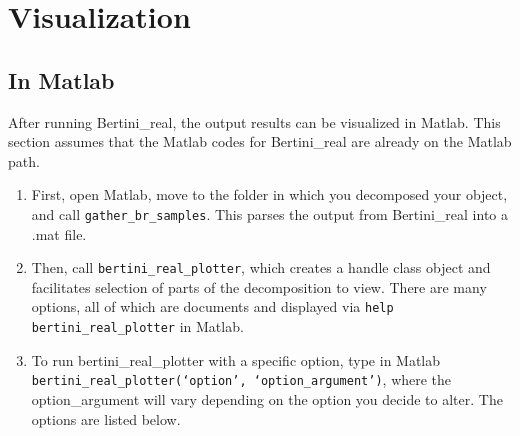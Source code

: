 
\section{Visualization}


\subsection{In Matlab}
After running Bertini\_real, the output results can be visualized in Matlab.  This section assumes that the Matlab codes for Bertini\_real are already on the Matlab path.

\begin{enumerate}
\item First, open Matlab, move to the folder in which you decomposed your object, and call \texttt{gather\_br\_samples}. This parses the output from Bertini\_real into a .mat file.
\item Then, call \texttt{bertini\_real\_plotter\-}, which creates a handle class object and facilitates selection of parts of the decomposition to view. There are many options, all of which are documents and displayed via \texttt{help bertini\_real\_plotter\-} in Matlab.
\item To run bertini\_real\_plotter with a specific option, type in Matlab\\ 
	\texttt{bertini\_real\_plotter\-(`option', `option\_argument')}, where the option\_argument will vary depending on the option you decide to alter. The options are listed below.
\end{enumerate}


